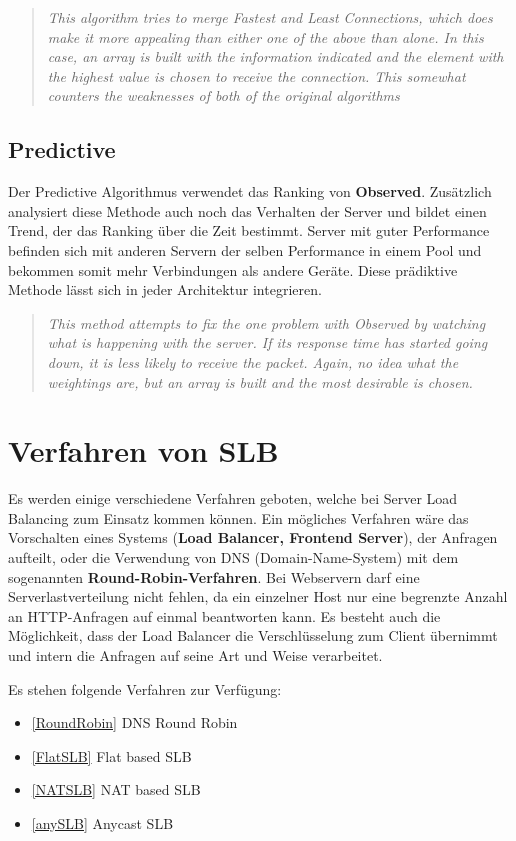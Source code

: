 \begin{quote}
	\textit{This algorithm tries to merge Fastest and Least Connections, which does make it more appealing than either one of the above than alone. In this case, an array is built with the information indicated and the element with the highest value is chosen to receive the connection. This somewhat counters the weaknesses of both of the original algorithms}
\end{quote}

\subsection{Predictive}
\label{Predictive}

Der Predictive Algorithmus verwendet das Ranking von \textbf{Observed}. Zusätzlich analysiert diese Methode auch noch das Verhalten der Server und bildet einen Trend, der das Ranking über die Zeit bestimmt. Server mit guter Performance befinden sich mit anderen Servern der selben Performance in einem Pool und bekommen somit mehr Verbindungen als andere Geräte. Diese prädiktive Methode lässt sich in jeder Architektur integrieren.

\begin{quote}
	\textit{This method attempts to fix the one problem with Observed by watching what is happening with the server. If its response time has started going down, it is less likely to receive the packet. Again, no idea what the weightings are, but an array is built and the most desirable is chosen.}
\end{quote}


\section{Verfahren von SLB}
Es werden einige verschiedene Verfahren geboten, welche bei Server Load Balancing zum Einsatz kommen können. Ein mögliches Verfahren wäre das Vorschalten eines Systems (\textbf{Load Balancer, Frontend Server}), der Anfragen aufteilt, oder die Verwendung von DNS (Domain-Name-System) mit dem sogenannten \textbf{Round-Robin-Verfahren}. Bei Webservern darf eine Serverlastverteilung nicht fehlen, da ein einzelner Host nur eine begrenzte Anzahl an HTTP-Anfragen auf einmal beantworten kann. Es besteht auch die Möglichkeit, dass der Load Balancer die Verschlüsselung zum Client übernimmt und intern die Anfragen auf seine Art und Weise verarbeitet. \newline

Es stehen folgende Verfahren zur Verfügung:
\begin{itemize}
	\item \ref{RoundRobin} DNS Round Robin
	\item \ref{FlatSLB} Flat based SLB
	\item \ref{NATSLB} NAT based SLB
	\item \ref{anySLB} Anycast SLB
\end{itemize}


